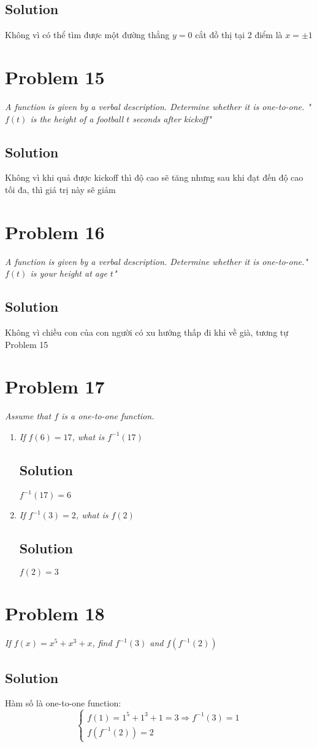 \documentclass[11pt]{article}
\newcommand{\soln}{\subsection*}
\newcommand{\qn}{\textit}
\begin{document}
\soln{Solution}
Không vì có thể tìm được một đường thẳng $y=0$ cắt đồ thị tại 2 điểm là $x=\pm 1$

\section*{Problem 15}

\qn{A function is given by a verbal description. Determine whether it is one-to-one. "$f(t)$ is the height of a football $t$ seconds after kickoff"}

\soln{Solution}
Không vì khi quả được kickoff thì độ cao sẽ tăng nhưng sau khi đạt đến độ cao tối đa, thì giá trị này sẽ giảm

\section*{Problem 16}

\qn{A function is given by a verbal description. Determine whether it is one-to-one."$f(t)$ is your height at age $t$"}

\soln{Solution}
Không vì chiều con của con người có xu hướng thấp đi khi về già, tương tự Problem 15

\section*{Problem 17}

\qn{Assume that $f$ is a one-to-one function.}
\begin{enumerate}
	\item \qn{If $f(6)=17$, what is $f^{-1}(17)$}
	\soln{Solution}
	$f^{-1}(17)=6$
	
	\item \qn{If $f^{-1}(3)=2$, what is $f(2)$}
	\soln{Solution}
	$f(2)=3$
\end{enumerate}

\section*{Problem 18}

\qn{If $f(x)=x^5+x^3+x$, find $f^{-1}(3)$ and $f(f^{-1}(2))$}

\soln{Solution}
Hàm số là one-to-one function:
\begin{equation*}
	\begin{cases}
		f(1)=1^5+1^3+1=3 \Rightarrow f^{-1}(3)=1 \\
		f(f^{-1}(2))=2
	\end{cases}
\end{equation*}
\end{document}
